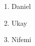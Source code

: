 \documentclass{article}
\begin{document}
	\begin{enumerate}
		\item Daniel
		\item Ukay
		\item Nifemi
	\end{enumerate}
\end{document}
